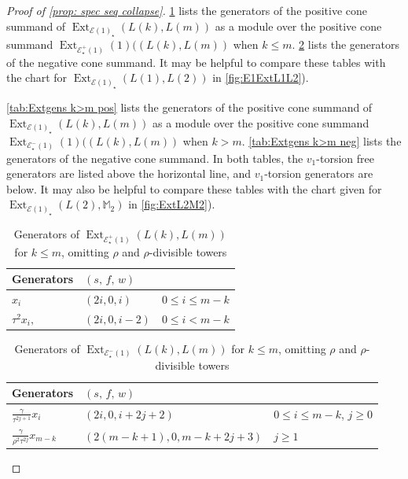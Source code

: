 \documentclass[10pt,a4paper]{amsart}
\DeclareMathOperator{\Ext}{Ext}
\newcommand{\cE}{{\mathcal E}}
\newcommand{\mM}{{\mathbb M}}
\begin{document}
\begin{proof}[Proof of \cref{prop: spec seq collapse}]
\cref{tab:Extgens k<m pos} lists the generators of the positive cone summand of $\Ext_{\cE (1)_\star} (L(k), L(m))$ as a module over the positive cone summand $\Ext_{\cE^{+}_{\star}(1)}(1)((L(k), L(m))$ when $k \le m$. \cref{tab:Extgens k<m neg} lists the generators of the negative cone summand. It may be helpful to compare these tables with the chart for $\Ext_{\cE (1)_\star} (L(1), L(2))$ in \cref{fig:E1ExtL1L2}). 

\cref{tab:Extgens k>m pos} lists the generators of the positive cone summand of $\Ext_{\cE (1)_\star} (L(k), L(m))$ as a module over the positive cone summand $\Ext_{\cE^{-}_{\star}(1)}(1)((L(k), L(m))$ when $k > m.$ \cref{tab:Extgens k>m neg} lists the generators of the negative cone summand. In both tables, the $v_{1}$-torsion free generators are listed above the horizontal line, and $v_{1}$-torsion generators are below. It may also be helpful to compare these tables with the chart given for $\Ext_{\cE (1)_\star} (L(2), \mM_2)$ in \cref{fig:ExtL2M2}).

\begin{table}[h!] 
    \centering
    \begin{tabular}{l |l |l}
            Generators & $(s,\, f,\, w)$ & \\
            \hline
            $x_{i}$ & $(2i, 0, i)$ & $0 \le i \le m-k$ \\
            $\tau^{2}x_{i},$ & $(2i, 0, i-2)$ & $0 \le i < m-k$ \\
    \end{tabular}
    \caption{Generators of $\Ext_{\cE^{+}_{\star}(1)} (L(k), L(m))$ for $k \le m$, omitting $\rho$ and $\rho$-divisible towers}
    \label{tab:Extgens k<m pos}
\end{table}

\begin{table}[h!] 
    \centering
    \begin{tabular}{l |l |l}
            Generators & $(s,\, f,\, w)$ & \\
            \hline
            $\frac{\gamma}{\tau^{2j+1}}x_{i}$ & $(2i, 0, i + 2j + 2)$ & $0 \le i \le m-k$, $j \ge 0$ \\
            $\frac{\gamma}{\rho^{2}\tau^{2j}}x_{m-k}$ & $(2(m-k+1), 0, m-k + 2j + 3)$ & $j \ge1 $ \\
    \end{tabular}
    \caption{Generators of $\Ext_{\cE^{-}_{\star}(1)} (L(k), L(m))$ for $k \le m$, omitting $\rho$ and $\rho$-divisible towers}
    \label{tab:Extgens k<m neg}
\end{table}


\end{proof}
\end{document}
